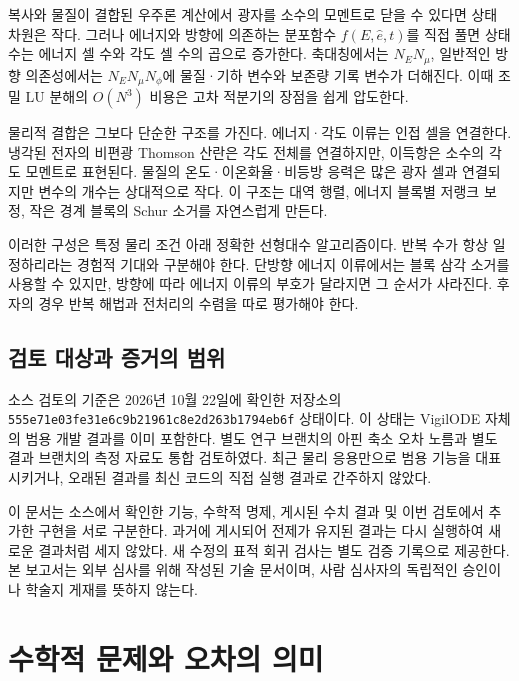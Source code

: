 \documentclass[
  10pt,
  a4paper,
]{article}
\begin{document}
복사와 물질이 결합된 우주론 계산에서 광자를 소수의 모멘트로 닫을 수
있다면 상태 차원은 작다. 그러나 에너지와 방향에 의존하는 분포함수
\(f(E,\hat e,t)\)를 직접 풀면 상태 수는 에너지 셀 수와 각도 셀 수의
곱으로 증가한다. 축대칭에서는 \(N_E N_\mu\), 일반적인 방향 의존성에서는
\(N_E N_\mu N_\phi\)에 물질·기하 변수와 보존량 기록 변수가 더해진다.
이때 조밀 LU 분해의 \(O(N^3)\) 비용은 고차 적분기의 장점을 쉽게
압도한다.

물리적 결합은 그보다 단순한 구조를 가진다. 에너지·각도 이류는 인접 셀을
연결한다. 냉각된 전자의 비편광 Thomson 산란은 각도 전체를 연결하지만,
이득항은 소수의 각도 모멘트로 표현된다. 물질의 온도·이온화율·비등방
응력은 많은 광자 셀과 연결되지만 변수의 개수는 상대적으로 작다. 이
구조는 대역 행렬, 에너지 블록별 저랭크 보정, 작은 경계 블록의 Schur
소거를 자연스럽게 만든다.

이러한 구성은 특정 물리 조건 아래 정확한 선형대수 알고리즘이다. 반복
수가 항상 일정하리라는 경험적 기대와 구분해야 한다. 단방향 에너지
이류에서는 블록 삼각 소거를 사용할 수 있지만, 방향에 따라 에너지 이류의
부호가 달라지면 그 순서가 사라진다. 후자의 경우 반복 해법과 전처리의
수렴을 따로 평가해야 한다.

\hypertarget{uxac80uxd1a0-uxb300uxc0c1uxacfc-uxc99duxac70uxc758-uxbc94uxc704}{%
\subsection{검토 대상과 증거의
범위}\label{uxac80uxd1a0-uxb300uxc0c1uxacfc-uxc99duxac70uxc758-uxbc94uxc704}}

소스 검토의 기준은 2026년 10월 22일에 확인한 저장소의
\texttt{555e71e03fe31e6c9b21961c8e2d263b1794eb6f} 상태이다. 이 상태는
VigilODE 자체의 범용 개발 결과를 이미 포함한다. 별도 연구 브랜치의 아핀
축소 오차 노름과 별도 결과 브랜치의 측정 자료도 통합 검토하였다. 최근
물리 응용만으로 범용 기능을 대표시키거나, 오래된 결과를 최신 코드의 직접
실행 결과로 간주하지 않았다.

이 문서는 소스에서 확인한 기능, 수학적 명제, 게시된 수치 결과 및 이번
검토에서 추가한 구현을 서로 구분한다. 과거에 게시되어 전제가 유지된
결과는 다시 실행하여 새로운 결과처럼 세지 않았다. 새 수정의 표적 회귀
검사는 별도 검증 기록으로 제공한다. 본 보고서는 외부 심사를 위해 작성된
기술 문서이며, 사람 심사자의 독립적인 승인이나 학술지 게재를 뜻하지
않는다.

\hypertarget{uxc218uxd559uxc801-uxbb38uxc81cuxc640-uxc624uxcc28uxc758-uxc758uxbbf8}{%
\section{수학적 문제와 오차의
의미}\label{uxc218uxd559uxc801-uxbb38uxc81cuxc640-uxc624uxcc28uxc758-uxc758uxbbf8}}
\end{document}
